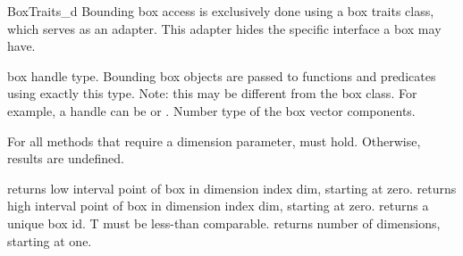 
\ccRefPageBegin
\begin{ccRefConcept}{BoxTraits_d}
Bounding box access is exclusively done using a box traits class, which serves as an adapter. This adapter hides the specific interface a box may have.

\ccTypes
{} {box handle type. Bounding box objects are passed to functions and predicates using exactly this type. Note: this may be different from the box class. For example, a handle can be  or .}
  {Number type of the box vector components.}



\ccOperations
For all methods that require a dimension parameter,  must hold. Otherwise, results are undefined.

 {returns low interval point of box in dimension index dim, starting at zero.}
 {returns high interval point of box in dimension index dim, starting at zero.}
 {returns a unique box id. T must be less-than comparable.}
 {returns number of dimensions, starting at one.}


\end{ccRefConcept}

\ccRefPageEnd
